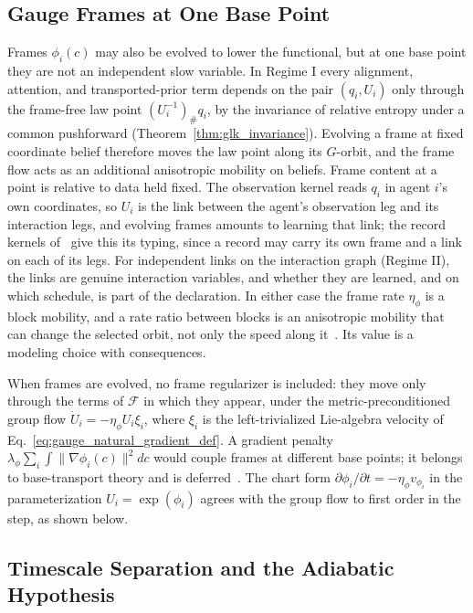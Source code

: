 \documentclass[11pt]{article}
\begin{document}
\subsection{Gauge Frames at One Base Point}
\label{sec:frame_evolution}

Frames $\phi_i(c)$ may also be evolved to lower the functional, but at one base point they are not an independent slow variable. In Regime I every alignment, attention, and transported-prior term depends on the pair $(q_i, U_i)$ only through the frame-free law point $(U_i^{-1})_\# q_i$, by the invariance of relative entropy under a common pushforward (Theorem~\ref{thm:glk_invariance}). Evolving a frame at fixed coordinate belief therefore moves the law point along its $G$-orbit, and the frame flow acts as an additional anisotropic mobility on beliefs. Frame content at a point is relative to data held fixed. The observation kernel reads $q_i$ in agent $i$'s own coordinates, so $U_i$ is the link between the agent's observation leg and its interaction legs, and evolving frames amounts to learning that link; the record kernels of~\cite[Ch.~5]{DennisGaugeVFE2026} give this its typing, since a record may carry its own frame and a link on each of its legs. For independent links on the interaction graph (Regime II), the links are genuine interaction variables, and whether they are learned, and on which schedule, is part of the declaration. In either case the frame rate $\eta_\phi$ is a block mobility, and a rate ratio between blocks is an anisotropic mobility that can change the selected orbit, not only the speed along it~\cite[Chs.~7 and~8]{DennisGaugeVFE2026}. Its value is a modeling choice with consequences.

When frames are evolved, no frame regularizer is included: they move only through the terms of $\mathcal{F}$ in which they appear, under the metric-preconditioned group flow $\dot U_i = -\eta_\phi U_i \xi_i$, where $\xi_i$ is the left-trivialized Lie-algebra velocity of Eq.~\eqref{eq:gauge_natural_gradient_def}. A gradient penalty $\lambda_\phi \sum_i \int \|\nabla \phi_i(c)\|^2  dc$ would couple frames at different base points; it belongs to base-transport theory and is deferred~\cite{DennisGaugeVFESuppB2026}. The chart form $\partial\phi_i/\partial t = -\eta_\phi v_{\phi_i}$ in the parameterization $U_i = \exp(\phi_i)$ agrees with the group flow to first order in the step, as shown below.

\subsection{Timescale Separation and the Adiabatic Hypothesis}
\label{sec:adiabatic_hierarchy}
\end{document}
